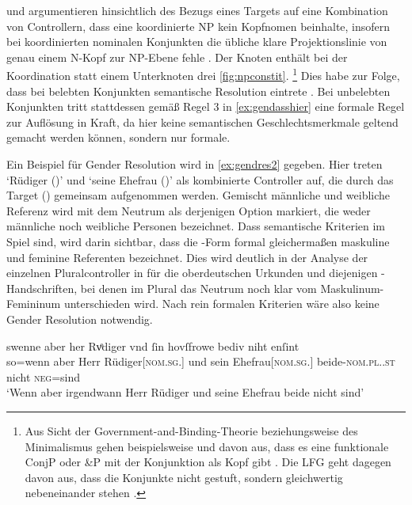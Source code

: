 \citet[182--183]{wechslerzlatic2003} und \citet[576]{wechsler2009}
argumentieren hinsichtlich des Bezugs eines Targets auf eine Kombination von
Controllern, dass eine koordinierte NP kein Kopf\-nomen beinhalte, insofern bei
koordinierten nominalen Konjunkten die übliche klare Projektionslinie von genau
einem N-Kopf zur NP-Ebene fehle \autocites[183,
Anm.~85]{wechslerzlatic2003}[585, Anm.~7]{wechsler2009}. Der Knoten 
enthält bei der Koordination statt einem Unterknoten drei \cref{fig:npconstit}.%
%
	\footnote{Aus Sicht der Government-and-Binding-Theorie beziehungsweise des
	Minimalismus gehen beispielsweise
	\textcites{johannessen1998}{johannessen2005} und \citet{shen2019} davon
	aus, dass es eine funktionale ConjP oder \&P mit der Konjunktion als Kopf
	gibt \autocite[dagegen aber][]{borsley2005}. Die LFG geht dagegen davon
	aus, dass die Konjunkte nicht gestuft, sondern gleichwertig nebeneinander
	stehen \autocites[vgl.~z.\,B.][]{peterson2004}{sadlernordlinger2006}.}
%
Dies habe zur Folge, dass bei belebten Konjunkten semantische Resolution
eintrete \autocites[183]{wechslerzlatic2003}[576]{wechsler2009}. Bei unbelebten
Konjunkten tritt stattdessen gemäß Regel 3 in \cref{ex:gendasshier} eine
formale Regel zur Auflösung in Kraft, da hier keine semantischen
Geschlechtsmerkmale geltend gemacht werden können, sondern nur formale.

Ein Beispiel für Gender Resolution wird in \cref{ex:gendres2} gegeben. Hier
treten  `Rüdiger (\MascM)' und  `seine Ehefrau
(\FemF)' als kombinierte Controller auf, die durch das Target 
(\NeutMF) gemeinsam aufgenommen werden. Gemischt männliche und weibliche
Referenz wird mit dem Neutrum als derjenigen Option markiert, die weder
männliche noch weibliche Personen bezeichnet. Dass semantische Kriterien im
Spiel sind, wird darin sichtbar, dass die -Form formal gleichermaßen
maskuline und feminine Referenten bezeichnet. Dies wird deutlich in der Analyse
der einzelnen Pluralcontroller in  für die
oberdeutschen Urkunden und diejenigen \KC{}-Handschriften, bei denen im Plural
das Neutrum noch klar vom Maskulinum-Femininum unterschieden wird. Nach rein
formalen Kriterien wäre also keine Gender Resolution notwendig.

\begin{exe}
\ex \label{ex:gendres2}
		\gll swenne aber her Rvͦdiger vnd ſin
			hovſfrowe bediv niht enſint \\
		so=wenn aber Herr Rüdiger[\textsc{nom.sg.\MascM}] und sein
			Ehefrau[\textsc{nom.sg.\FemF}] beide-\textsc{nom.pl.\NeutMF.st}
			nicht \textsc{neg}=sind \\
		\trans `Wenn aber irgendwann Herr Rüdiger und seine Ehefrau
			beide nicht  sind'
			\parencites(Nr.~3262, Regensburg, 1299)[425,13--14]{cao4}
\end{exe}

